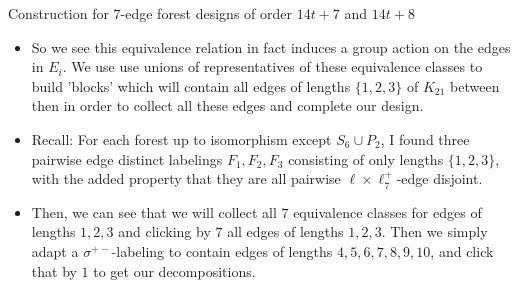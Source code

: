 \documentclass{beamer}
\theoremstyle{plain}
\begin{document}
\begin{frame}{Construction for $7$-edge forest designs of order $14t+7$ and $14t+8$}
    \begin{itemize}
    \item So we see this equivalence relation in fact induces a group action on the edges in $E_{i}$.  We use use unions of representatives of these equivalence classes to build 'blocks' which will contain all edges of lengths $\{1,2,3\}$ of $K_{21}$ between then in order to collect all these edges and complete our design. 
    \item Recall: For each forest up to isomorphism except $S_{6}\cup P_{2}$, I found three pairwise edge distinct labelings $F_{1},F_{2},F_{3}$ consisting of only lengths $\{1,2,3\}$, with the added property that they are all pairwise $\ell\times \ell^{+}_{7}$-edge disjoint.
    \item Then, we can see that we will collect all $7$ equivalence classes for edges of lengths $1,2,3$ and clicking by $7$ all edges of lengths $1,2,3$. Then we simply adapt a $\sigma^{+-}$-labeling to contain edges of lengths $4,5,6,7,8,9,10$, and click that by $1$ to get our decompositions.
    \end{itemize}

\end{frame}
\end{document}
